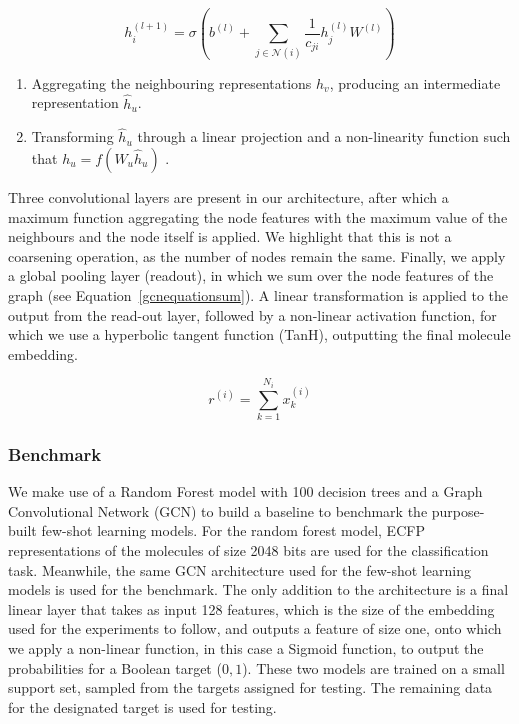 \documentclass[journal=acscii,manuscript=article]{achemso}
\begin{document}
\begin{equation}
\label{gcnequation2}
h_i^{(l+1)} = \sigma(b^{(l)} + \sum_{j\in\mathcal{N}(i)}\frac{1}{c_{ji}}h_j^{(l)}W^{(l)})
\end{equation}

\begin{enumerate}
    \item Aggregating the neighbouring representations $h_v$, producing an intermediate representation $\hat{h}_u$.
    \item Transforming $\hat{h}_u$ through a linear projection and a non-linearity function such that $h_u = f(W_u \hat{h}_u)$ \citep{kipf2016semi}.
\end{enumerate}

Three convolutional layers are present in our architecture, after which a maximum function aggregating the node features with the maximum value of the neighbours and the node itself is applied. We highlight that this is not a coarsening operation, as the number of nodes remain the same. Finally, we apply a global pooling layer (readout), in which we sum over the node features of the graph (see Equation~\ref{gcnequationsum}). A linear transformation is applied to the output from the read-out layer, followed by a non-linear activation function, for which we use a hyperbolic tangent function (TanH), outputting the final molecule embedding.

\begin{equation}
\label{gcnequationsum}
r^{(i)} = \sum_{k=1}^{N_i} x^{(i)}_k
\end{equation}


\subsubsection{Benchmark}

We make use of a Random Forest model with 100 decision trees and a Graph Convolutional Network (GCN) to build a baseline to benchmark the purpose-built few-shot learning models. For the random forest model, ECFP representations of the molecules of size 2048 bits are used for the classification task. Meanwhile, the same GCN architecture used for the few-shot learning models is used for the benchmark. The only addition to the architecture is a final linear layer that takes as input 128 features, which is the size of the embedding used for the experiments to follow, and outputs a feature of size one, onto which we apply a non-linear function, in this case a Sigmoid function, to output the probabilities for a Boolean target (${0, 1}$). These two models are trained on a small support set, sampled from the targets assigned for testing. The remaining data for the designated target is used for testing.
\end{document}
